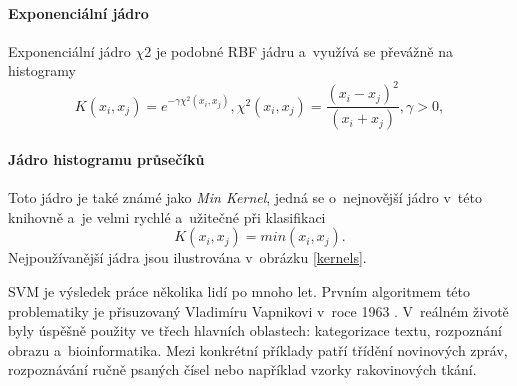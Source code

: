 \paragraph*{Exponenciální jádro} 
Exponenciální jádro $\chi$2 je podobné RBF jádru a~využívá se převážně na histogramy
\begin{equation*}
\label{expK}
 K(x_i, x_j) = e^{-\gamma \chi^2(x_i,x_j)}, \chi^2(x_i,x_j) = \frac{(x_i-x_j)^2}{(x_i+x_j)}, \gamma > 0,
\end{equation*}

\paragraph*{Jádro histogramu průsečíků} 
Toto jádro je také známé jako \textit{Min Kernel}, jedná se o~nejnovější jádro v~této knihovně a~je velmi rychlé a~užitečné při klasifikaci
\begin{equation*}
\label{innK}
 K(x_i, x_j) = min(x_i,x_j).
\end{equation*}
Nejpoužívanější jádra jsou ilustrována v~obrázku \ref{kernels}.

SVM je výsledek práce několika lidí po mnoho let. Prvním algoritmem této problematiky je přisuzovaný Vladimíru Vapnikovi v~roce 1963 \cite{svm:vapnik}. V~reálném životě byly úspěšně použity ve třech hlavních oblastech: kategorizace textu, rozpoznání obrazu a~bioinformatika. Mezi konkrétní příklady patří třídění novinových zpráv, rozpoznávání ručně psaných čísel nebo například vzorky rakovinových tkání.

